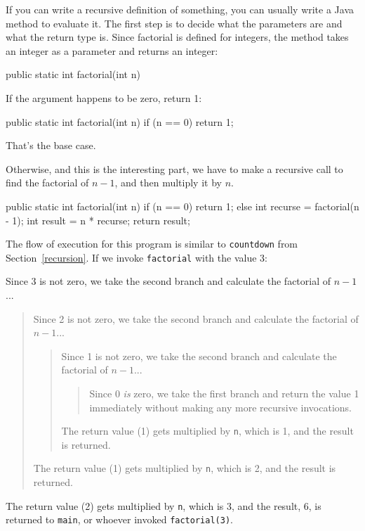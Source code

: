\documentclass[12pt]{book}
\begin{document}
If you can write a recursive definition of something, you can usually write a Java method to evaluate it.
The first step is to decide what the parameters are and what the return type is.
Since factorial is defined for integers, the method takes an integer as a parameter and returns an integer:

\begin{code}
    public static int factorial(int n) {
    }
\end{code}

If the argument happens to be zero, return 1:

\begin{code}
    public static int factorial(int n) {
        if (n == 0) {
            return 1;
        }
    }
\end{code}

That's the base case.

Otherwise, and this is the interesting part, we have to make a recursive call to find the factorial of $n-1$, and then multiply it by $n$.

\begin{code}
    public static int factorial(int n) {
        if (n == 0) {
            return 1;
        } else {
            int recurse = factorial(n - 1);
            int result = n * recurse;
            return result;
        }
    }
\end{code}

The flow of execution for this program is similar to {\tt countdown} from Section~\ref{recursion}.
If we invoke {\tt factorial} with the value 3:

Since 3 is not zero, we take the second branch and calculate the factorial of $n-1$...
\begin{quote}
Since 2 is not zero, we take the second branch and calculate the factorial of $n-1$...
\begin{quote}
Since 1 is not zero, we take the second branch and calculate the factorial of $n-1$...
\begin{quote}
Since 0 {\em is} zero, we take the first branch and return the value 1 immediately without making any more recursive invocations.
\end{quote}
The return value (1) gets multiplied by {\tt n}, which is 1, and the result is returned.
\end{quote}
The return value (1) gets multiplied by {\tt n}, which is 2, and the result is returned.
\end{quote}
The return value (2) gets multiplied by {\tt n}, which is 3, and the result, 6, is returned to {\tt main}, or whoever invoked {\tt factorial(3)}.
\end{document}
